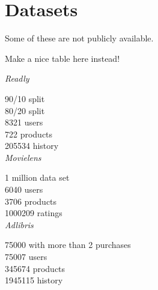 \chapter{Datasets}\label{cha:datasets}

Some of these are not publicly available.

Make a nice table here instead!

\emph{Readly}

 90/10 split \\
 80/20 split \\

8321 users \\
722 products \\
205534 history \\


\emph{Movielens}

1 million data set \\
6040 users \\
3706 products \\
1000209 ratings \\


\emph{Adlibris}

75000 with more than 2 purchases \\
75007 users \\
345674 products \\
1945115 history \\

